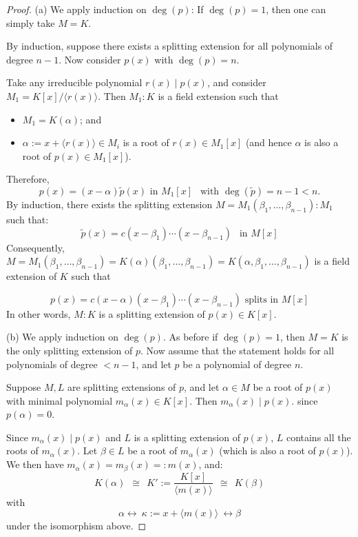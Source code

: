 \documentclass[11pt]{book}
\begin{document}
\begin{proof}
(a) We apply induction on $\deg(p)$: If $\deg(p) = 1$, then one can simply take $M = K$.

By induction, suppose there exists a splitting extension for all polynomials of degree $n-1$. Now consider $p(x)$ with $\deg(p) = n$.

Take any irreducible polynomial $r(x) \mid p(x)$, and consider $M_1 = K[x] / \langle r(x) \rangle$. Then $M_1 : K$ is 
a field extension such that 
\begin{itemize}
    \item $M_1 = K(\alpha)$; and
    \item $\alpha := x + \langle r(x) \rangle \in M_i$ is a root of $r(x) \in M_1[x]$ (and hence $\alpha$ is also a root of $p(x) \in M_1[x]$).
\end{itemize}
Therefore,
    \[
    p(x) = (x-\alpha)\widetilde{p}(x) \text{ in } M_1[x]\ \ \text{ with } \deg(\widetilde{p}) = n-1 < n.
    \]
By induction, there exists the splitting extension $M = M_1(\beta_1, \dots, \beta_{n-1}) : M_1$ such that:
    \[
    \widetilde{p}(x) = c(x - \beta_1) \cdots (x - \beta_{n-1})\ \ \text{ in } M[x]
    \]
Consequently, $M = M_1(\beta_1, \dots, \beta_{n-1}) = K(\alpha)(\beta_1, \dots, \beta_{n-1}) = K(\alpha, \beta_1, \dots, \beta_{n-1})$ is a field extension of $K$ such that

\[p(x) = c(x - \alpha)(x - \beta_1) \cdots (x - \beta_{n-1}) \text{ splits in } M[x]
    \]
In other words, $M:K$ is a splitting extension of $p(x) \in K[x]$.

\vspace{3mm}
\noindent (b) We apply induction on $\deg(p)$. As before if $\deg(p) = 1$, then $M = K$ is the only splitting extension of $p$. Now assume that the statement holds for all polynomials of degree $< n-1$, and let $p$ be a polynomial of degree $n$.

Suppose $M, L$ are splitting extensions of $p$, and let $\alpha \in M$ be a root of $p(x)$ with minimal polynomial $m_\alpha(x) \in K[x]$. Then  $m_\alpha(x) \mid p(x)$.
since $p(\alpha) = 0$. 

Since $m_{\alpha}(x) \mid p(x)$ and $L$ is a splitting extension of $p(x)$, $L$ contains all the roots of $m_{\alpha}(x)$. Let $\beta \in L$ be a root of $m_\alpha(x)$ (which is also a root of $p(x)$). We then have $m_\alpha(x) = m_{\beta}(x) =: m(x)$, and:
    \[
    K(\alpha)\ \ \cong\ \ K':=\frac{K[x]}{\langle m(x) \rangle}\ \ \cong\ \  K(\beta) 
    \]
with 
\[\alpha \longleftrightarrow\ \kappa:= x + \langle m(x) \rangle\ \longleftrightarrow \beta\]
under the isomorphism above.


\end{proof}
\end{document}
